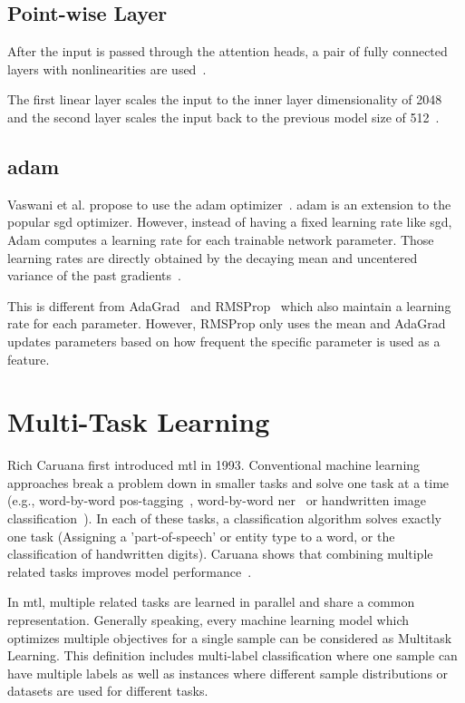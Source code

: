 \subsection{Point-wise Layer}

After the input is passed through the attention heads, a pair of fully connected layers with nonlinearities are used~\cite{Vaswani2017d}. 

The first linear layer scales the input to the inner layer dimensionality of 2048 and the second layer scales the input back to the previous model size of 512~\cite{Vaswani2017d}.

\subsection{\gls{adam}}

Vaswani et al. propose to use the \acrfull{adam} optimizer~\cite{Kingma2014}. \gls{adam} is an extension to the popular \gls{sgd} optimizer. However, instead of having a fixed learning rate like \gls{sgd}, Adam computes a learning rate for each trainable network parameter. Those learning rates are directly obtained by the decaying mean and uncentered variance of the past gradients~\cite{Kingma2014}.
\medskip

This is different from AdaGrad~\cite{Duchi2011} and RMSProp~\cite{Hinton} which also maintain a learning rate for each parameter. However, RMSProp only uses the mean and AdaGrad updates parameters based on how frequent the specific parameter is used as a feature.

\section{Multi-Task Learning}

Rich Caruana first introduced \acrfull{mtl} in 1993. Conventional machine learning approaches break a problem down in smaller tasks and solve one task at a time (e.g., word-by-word \gls{pos}-tagging~\cite{Toutanova2007}, word-by-word \gls{ner}~\cite{Sang2003} or handwritten image classification~\cite{LeCun;1990}). In each of these tasks, a classification algorithm solves exactly one task (Assigning a 'part-of-speech' or entity type to a word, or the classification of handwritten digits). Caruana shows that combining multiple related tasks improves model performance~\cite{Caruana1993}\cite{Caruana1997a}. 

In \gls{mtl}, multiple related tasks are learned in parallel and share a common representation. Generally speaking, every machine learning model which optimizes multiple objectives for a single sample can be considered as Multitask Learning. This definition includes multi-label classification where one sample can have multiple labels as well as instances where different sample distributions or datasets are used for different tasks.


